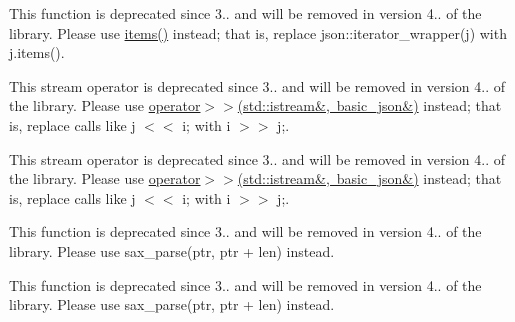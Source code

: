 \begin{DoxyRefList}
%
This function is deprecated since 3.. and will be removed in version 4.. of the library. Please use \mbox{\hyperlink{classbasic__json_ac12884e86980aa85b6a9ffbb8b84de6a}{items()}} instead; that is, replace {\ttfamily json\+::iterator\+\_\+wrapper(j)} with {\ttfamily j.\+items()}.  
\item[Member \mbox{\hyperlink{classbasic__json_af9907af448f7ff794120033e132025f6}{basic\+\_\+json\texorpdfstring{$<$}{<} Object\+Type, Array\+Type, String\+Type, Boolean\+Type, Number\+Integer\+Type, Number\+Unsigned\+Type, Number\+Float\+Type, Allocator\+Type, JSONSerializer, Binary\+Type, Custom\+Base\+Class \texorpdfstring{$>$}{>}\+::operator\texorpdfstring{$<$}{<}\texorpdfstring{$<$}{<}}} (\mbox{\hyperlink{classbasic__json}{basic\+\_\+json}} \&j, std\+::istream \&i)]\label{deprecated__deprecated000004}%
%
This stream operator is deprecated since 3.. and will be removed in version 4.. of the library. Please use \mbox{\hyperlink{classbasic__json_aea0de29387d532e0bc5f2475cb83995d}{operator$>$$>$(std\+::istream\&, basic\+\_\+json\&)}} instead; that is, replace calls like {\ttfamily j \texorpdfstring{$<$}{<}\texorpdfstring{$<$}{<} i;} with {\ttfamily i \texorpdfstring{$>$}{>}\texorpdfstring{$>$}{>} j;}. 

\label{deprecated__deprecated000008}%
%
This stream operator is deprecated since 3.. and will be removed in version 4.. of the library. Please use \mbox{\hyperlink{classbasic__json_aea0de29387d532e0bc5f2475cb83995d}{operator$>$$>$(std\+::istream\&, basic\+\_\+json\&)}} instead; that is, replace calls like {\ttfamily j \texorpdfstring{$<$}{<}\texorpdfstring{$<$}{<} i;} with {\ttfamily i \texorpdfstring{$>$}{>}\texorpdfstring{$>$}{>} j;}.  
\item[Member \mbox{\hyperlink{classbasic__json_ad018e709338c810c56eaad606186a77e}{basic\+\_\+json\texorpdfstring{$<$}{<} Object\+Type, Array\+Type, String\+Type, Boolean\+Type, Number\+Integer\+Type, Number\+Unsigned\+Type, Number\+Float\+Type, Allocator\+Type, JSONSerializer, Binary\+Type, Custom\+Base\+Class \texorpdfstring{$>$}{>}\+::sax\+\_\+parse}} (\mbox{\hyperlink{classdetail_1_1span__input__adapter}{detail\+::span\+\_\+input\+\_\+adapter}} \&\&i, SAX $\ast$sax, input\+\_\+format\+\_\+t format=input\+\_\+format\+\_\+t\+::json, const bool strict=true, const bool ignore\+\_\+comments=false)]\label{deprecated__deprecated000003}%
%
This function is deprecated since 3.. and will be removed in version 4.. of the library. Please use sax\+\_\+parse(ptr, ptr + len) instead. 

\label{deprecated__deprecated000007}%
%
This function is deprecated since 3.. and will be removed in version 4.. of the library. Please use sax\+\_\+parse(ptr, ptr + len) instead. 
\end{DoxyRefList}